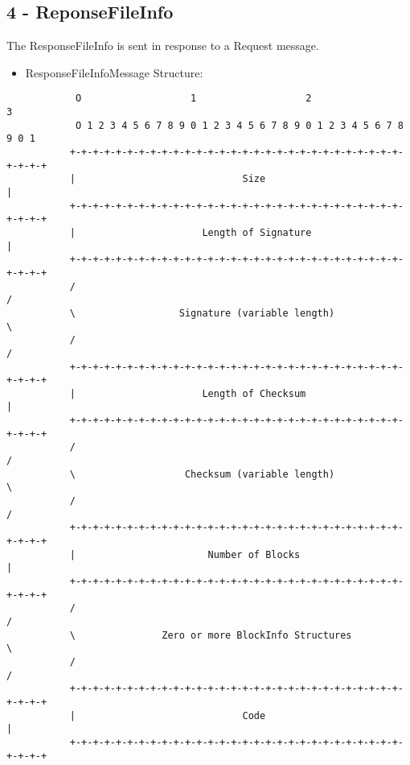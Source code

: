 \subsection{4 - ReponseFileInfo}

The ResponseFileInfo is sent in response to a Request message.

\begin{itemize}
 \item ResponseFileInfoMessage Structure:
\end{itemize}

\begin{verbatim}
            O                   1                   2                   3
            O 1 2 3 4 5 6 7 8 9 0 1 2 3 4 5 6 7 8 9 0 1 2 3 4 5 6 7 8 9 0 1
           +-+-+-+-+-+-+-+-+-+-+-+-+-+-+-+-+-+-+-+-+-+-+-+-+-+-+-+-+-+-+-+-+
           |                             Size                              |
           +-+-+-+-+-+-+-+-+-+-+-+-+-+-+-+-+-+-+-+-+-+-+-+-+-+-+-+-+-+-+-+-+
           |                      Length of Signature                      |
           +-+-+-+-+-+-+-+-+-+-+-+-+-+-+-+-+-+-+-+-+-+-+-+-+-+-+-+-+-+-+-+-+
           /                                                               /
           \                  Signature (variable length)                  \
           /                                                               /
           +-+-+-+-+-+-+-+-+-+-+-+-+-+-+-+-+-+-+-+-+-+-+-+-+-+-+-+-+-+-+-+-+
           |                      Length of Checksum                       |
           +-+-+-+-+-+-+-+-+-+-+-+-+-+-+-+-+-+-+-+-+-+-+-+-+-+-+-+-+-+-+-+-+
           /                                                               /
           \                   Checksum (variable length)                  \
           /                                                               /
           +-+-+-+-+-+-+-+-+-+-+-+-+-+-+-+-+-+-+-+-+-+-+-+-+-+-+-+-+-+-+-+-+
           |                       Number of Blocks                        |
           +-+-+-+-+-+-+-+-+-+-+-+-+-+-+-+-+-+-+-+-+-+-+-+-+-+-+-+-+-+-+-+-+
           /                                                               /
           \               Zero or more BlockInfo Structures               \
           /                                                               /
           +-+-+-+-+-+-+-+-+-+-+-+-+-+-+-+-+-+-+-+-+-+-+-+-+-+-+-+-+-+-+-+-+
           |                             Code                              |
           +-+-+-+-+-+-+-+-+-+-+-+-+-+-+-+-+-+-+-+-+-+-+-+-+-+-+-+-+-+-+-+-+
\end{verbatim}

